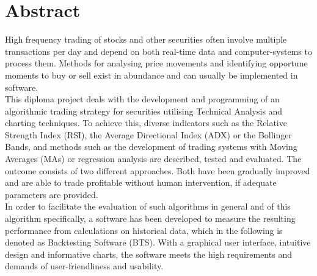 \chapter*{Abstract}

High frequency trading of stocks and other securities often involve multiple transactions per day and depend on both real-time data
and computer-systems to process them.
Methods for analysing price movements and identifying opportune moments to buy or sell exist in abundance and can usually be
implemented in software.\\

This diploma project deals with the development and programming of an algorithmic trading strategy for securities
utilising Technical Analysis and charting techniques. 
To achieve this, diverse indicators such as the Relative Strength Index (RSI), the Average Directional Index (ADX) or the Bollinger Bands, and methods such as the development of trading systems
with Moving Averages (MAs) or regression analysis are described, tested and evaluated. The outcome consists of two dif\-ferent approaches. Both have been gradually improved and are able to trade profitable without human intervention, if adequate parameters are provided.\\

In order to facilitate the evaluation of such algorithms in general and of this algorithm specifically, a software has been developed to
measure the resulting performance from calculations on historical data, which in the following is denoted as Backtesting Software (BTS).
With a graphical user interface, intuitive design and informative charts, the software meets the high requirements and demands of user-friendliness and usability.